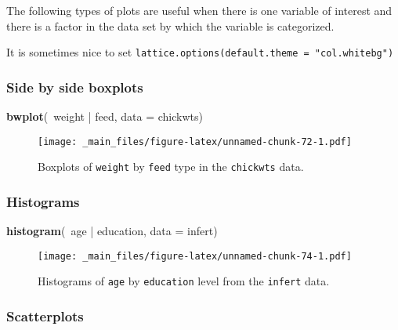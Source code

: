 \documentclass[]{book}
\newenvironment{Shaded}{\begin{snugshade}}{\end{snugshade}}
\newcommand{\KeywordTok}[1]{\textcolor[rgb]{0.13,0.29,0.53}{\textbf{{#1}}}}
\newcommand{\DataTypeTok}[1]{\textcolor[rgb]{0.13,0.29,0.53}{{#1}}}
\newcommand{\StringTok}[1]{\textcolor[rgb]{0.31,0.60,0.02}{{#1}}}
\newcommand{\NormalTok}[1]{{#1}}
\numberwithin{equation}{chapter}
\numberwithin{figure}{chapter}
\theoremstyle{plain}
\theoremstyle{definition}
\theoremstyle{remark}
\theoremstyle{definition}
\theoremstyle{definition}
\theoremstyle{remark}
\begin{document}
The following types of plots are useful when there is one variable of
interest and there is a factor in the data set by which the variable is
categorized.

It is sometimes nice to set
\texttt{lattice.options(default.theme\ =\ "col.whitebg")}

\subsubsection{Side by side boxplots}\label{side-by-side-boxplots}

\begin{Shaded}
\begin{Highlighting}[]
\KeywordTok{bwplot}\NormalTok{(~weight |}\StringTok{ }\NormalTok{feed, }\DataTypeTok{data =} \NormalTok{chickwts)}
\end{Highlighting}
\end{Shaded}

\begin{figure}[htbp]
\centering
\texttt{[image: \_main\_files/figure-latex/unnamed-chunk-72-1.pdf]}
\caption{\label{fig:unnamed-chunk-72}\small Boxplots of \texttt{weight} by \texttt{feed}
type in the \texttt{chickwts} data.}
\end{figure}




\subsubsection{Histograms}\label{histograms}

\begin{Shaded}
\begin{Highlighting}[]
\KeywordTok{histogram}\NormalTok{(~age |}\StringTok{ }\NormalTok{education, }\DataTypeTok{data =} \NormalTok{infert)}
\end{Highlighting}
\end{Shaded}

\begin{figure}[htbp]
\centering
\texttt{[image: \_main\_files/figure-latex/unnamed-chunk-74-1.pdf]}
\caption{\label{fig:unnamed-chunk-74}\small Histograms of \texttt{age} by \texttt{education}
level from the \texttt{infert} data.}
\end{figure}




\subsubsection{Scatterplots}\label{scatterplots}
\end{document}
